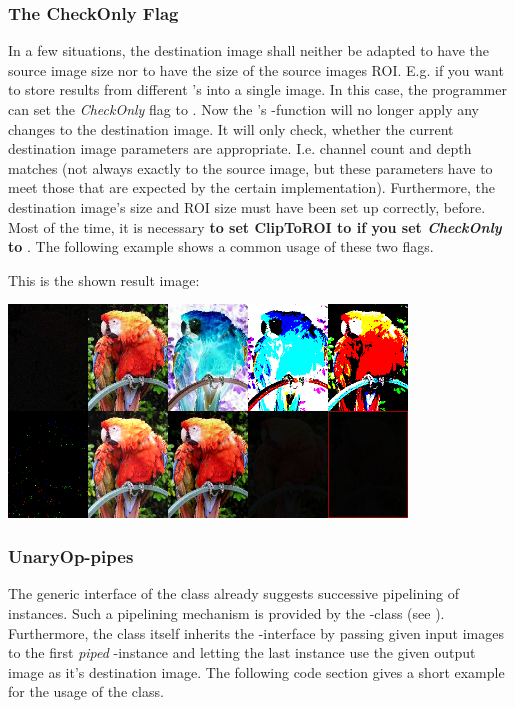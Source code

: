 \subsubsection{The CheckOnly Flag\label{subsec:check-only}}
In a few situations, the destination image shall neither be adapted to have the source image size nor to have the size of the source images ROI. E.g. if you want to store results from different 's into a single image. In this case, the programmer can set the  \emph{CheckOnly} flag to . Now the 's -function will no longer apply any changes to the destination image. It will only check, whether the current destination image parameters are appropriate. I.e. channel count and depth matches (not always exactly to the source image, but these parameters have to meet those that are expected by the certain  implementation). Furthermore, the destination image's size and ROI size must have been set up correctly, before. Most of the time, it is necessary \textbf{to set ClipToROI to  if you set \emph{CheckOnly} to }. The following example shows a common usage of these two flags.


This is the shown result image:

\includegraphics[width=300pt]{media/check-only-example-output}

\subsubsection{UnaryOp-pipes}

The generic interface of the  class already suggests successive pipelining of  instances. Such a pipelining mechanism is provided by the -class (see ). Furthermore, the  class itself inherits the -interface by passing given input images to the first \emph{piped} -instance and letting the last  instance use the given output image as it's destination image. The following code section gives a short example for the usage of the  class.

